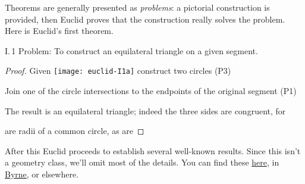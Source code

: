 Theorems are generally presented as \emph{problems}: a pictorial construction is provided, then Euclid proves that the construction really solves the problem. Here is Euclid's first theorem.

\begin{thm*}{I.\,1}{}\label{pg:euclidI1}
Problem: To construct an equilateral triangle on a given segment.
\end{thm*}

\begin{proof}
Given \texttt{[image: euclid-I1a]} construct two circles (P3)\quad{}\par\vspace{-23pt}
Join one of the circle intersections to the endpoints of the original segment (P1)\quad {}\par\vspace{-11pt}
The result is an equilateral triangle; indeed the three sides are congruent, for\par {} are radii of a common circle,
as are 
\end{proof}

\goodbreak

After this Euclid proceeds to establish several well-known results. Since this isn't a geometry class, we'll omit most of the details. You can find these \href{http://math.uci.edu/~ndonalds/math161/euclid.pdf}{here,} in \href{http://math.uci.edu/~ndonalds/Elements-I-VI.pdf}{Byrne,} or elsewhere.

